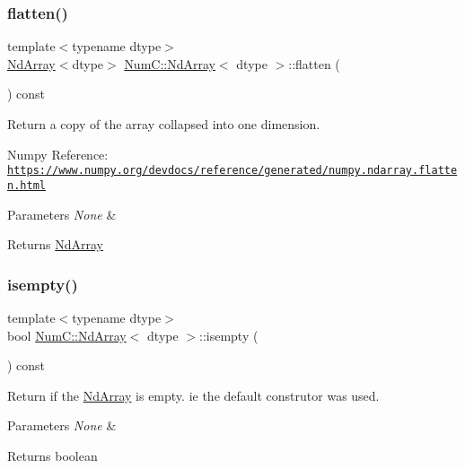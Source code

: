 \subsubsection{\texorpdfstring{flatten()}{flatten()}}
{\footnotesize\ttfamily template$<$typename dtype$>$ \\
\mbox{\hyperlink{class_num_c_1_1_nd_array}{Nd\+Array}}$<$dtype$>$ \mbox{\hyperlink{class_num_c_1_1_nd_array}{Num\+C\+::\+Nd\+Array}}$<$ dtype $>$\+::flatten (\begin{DoxyParamCaption}{ }\end{DoxyParamCaption}) const\hspace{0.3cm}{\ttfamily [inline]}}

Return a copy of the array collapsed into one dimension.

Numpy Reference\+: \href{https://www.numpy.org/devdocs/reference/generated/numpy.ndarray.flatten.html}{\tt https\+://www.\+numpy.\+org/devdocs/reference/generated/numpy.\+ndarray.\+flatten.\+html}


\begin{DoxyParams}{Parameters}
{\em None} & \\
\hline
\end{DoxyParams}
\begin{DoxyReturn}{Returns}
\mbox{\hyperlink{class_num_c_1_1_nd_array}{Nd\+Array}} 
\end{DoxyReturn}
\mbox{\label{class_num_c_1_1_nd_array_af21818e8cf4a9c0938a3f444894d0fea}} 
\subsubsection{\texorpdfstring{isempty()}{isempty()}}
{\footnotesize\ttfamily template$<$typename dtype$>$ \\
bool \mbox{\hyperlink{class_num_c_1_1_nd_array}{Num\+C\+::\+Nd\+Array}}$<$ dtype $>$\+::isempty (\begin{DoxyParamCaption}{ }\end{DoxyParamCaption}) const\hspace{0.3cm}{\ttfamily [inline]}}

Return if the \mbox{\hyperlink{class_num_c_1_1_nd_array}{Nd\+Array}} is empty. ie the default construtor was used.


\begin{DoxyParams}{Parameters}
{\em None} & \\
\hline
\end{DoxyParams}
\begin{DoxyReturn}{Returns}
boolean 
\end{DoxyReturn}
\mbox{\label{class_num_c_1_1_nd_array_a3be50d8f34980d81b51bdf25d09ffdfb}} 
